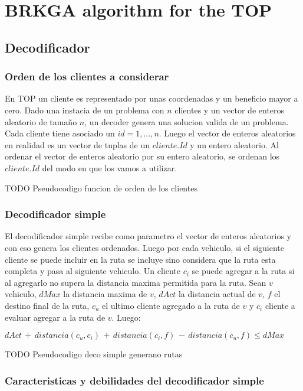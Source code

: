 
\chapter{BRKGA algorithm for the TOP}

\section{Decodificador}

\subsection{Orden de los clientes a considerar}

En TOP un cliente es representado por unas coordenadas y un beneficio mayor a cero. Dado una instacia de un problema con $n$ clientes y un vector de enteros aleatorio de tamaño $n$, un decoder genera una solucion valida de un problema. Cada cliente tiene asociado un $id = 1,...,n$. Luego el vector de enteros aleatorios en realidad es un vector de tuplas de un $cliente.Id$ y un entero aleatorio. Al ordenar el vector de enteros aleatorio por su entero aleatorio, se ordenan los $cliente.Id$ del modo en que los vamos a utilizar.

TODO Pseudocodigo funcion de orden de los clientes

\subsection{Decodificador simple}

El decodificador simple recibe como parametro el vector de enteros aleatorios y con eso genera los clientes ordenados. Luego por cada vehiculo, si el siguiente cliente se puede incluir en la ruta se incluye sino considera que la ruta esta completa y pasa al siguiente vehiculo. Un cliente $c_i$ se puede agregar a la ruta si al agregarlo no supera la distancia maxima permitida para la ruta. Sean $v$ vehiculo, $dMax$ la distancia maxima de $v$, $dAct$ la distancia actual de $v$, $f$ el destino final de la ruta, $c_u$ el ultimo cliente agregado a la ruta de $v$ y $c_i$ cliente a evaluar agregar a la ruta de $v$. Luego:

\( dAct\, +\, distancia(c_u, c_i)\, +\, distancia(c_i, f)\, -\, distancia(c_u, f) \leq dMax\)

\bigskip

TODO Pseudocodigo deco simple generano rutas

\subsection{Caracteristicas y debilidades del decodificador simple}

